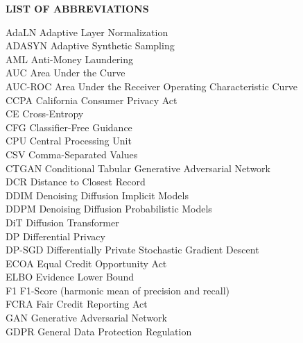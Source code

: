 \newpage
\begin{center}
{\LARGE\bf LIST OF ABBREVIATIONS}
\end{center}
\vspace{0.5cm}

\noindent AdaLN \dotfill Adaptive Layer Normalization \\[4pt]
\noindent ADASYN \dotfill Adaptive Synthetic Sampling \\[4pt]
\noindent AML \dotfill Anti-Money Laundering \\[4pt]
\noindent AUC \dotfill Area Under the Curve \\[4pt]
\noindent AUC-ROC \dotfill Area Under the Receiver Operating Characteristic Curve \\[4pt]
\noindent CCPA \dotfill California Consumer Privacy Act \\[4pt]
\noindent CE \dotfill Cross-Entropy \\[4pt]
\noindent CFG \dotfill Classifier-Free Guidance \\[4pt]
\noindent CPU \dotfill Central Processing Unit \\[4pt]
\noindent CSV \dotfill Comma-Separated Values \\[4pt]
\noindent CTGAN \dotfill Conditional Tabular Generative Adversarial Network \\[4pt]
\noindent DCR \dotfill Distance to Closest Record \\[4pt]
\noindent DDIM \dotfill Denoising Diffusion Implicit Models \\[4pt]
\noindent DDPM \dotfill Denoising Diffusion Probabilistic Models \\[4pt]
\noindent DiT \dotfill Diffusion Transformer \\[4pt]
\noindent DP \dotfill Differential Privacy \\[4pt]
\noindent DP-SGD \dotfill Differentially Private Stochastic Gradient Descent \\[4pt]
\noindent ECOA \dotfill Equal Credit Opportunity Act \\[4pt]
\noindent ELBO \dotfill Evidence Lower Bound \\[4pt]
\noindent F1 \dotfill F1-Score (harmonic mean of precision and recall) \\[4pt]
\noindent FCRA \dotfill Fair Credit Reporting Act \\[4pt]
\noindent GAN \dotfill Generative Adversarial Network \\[4pt]
\noindent GDPR \dotfill General Data Protection Regulation \\[4pt]
